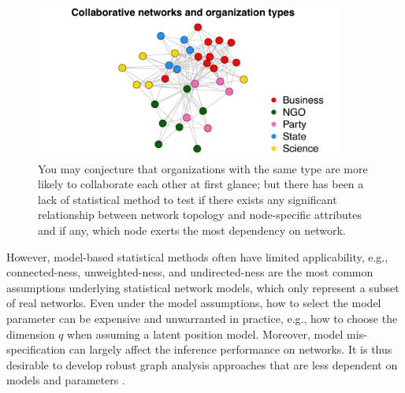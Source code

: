 \documentclass[11pt]{article}
\theoremstyle{definition}
\begin{document}
\begin{figure}[h]
	\centering
	\includegraphics[width=4in]{../Figure/introplot.pdf}	
	\caption{You may conjecture that organizations with the same type are more likely to collaborate each other at first glance; but there has been a lack of statistical method to test if there exists any significant relationship between network topology and node-specific attributes and if any, which node exerts the most dependency on network.}
	\label{fig:intro}
\end{figure}

However, model-based statistical methods often have limited applicability, e.g., connected-ness, unweighted-ness, and undirected-ness are the most common assumptions underlying statistical network models, which only represent a subset of real networks. Even under the model assumptions, how to select the model parameter can be expensive and unwarranted in practice, e.g., how to choose the dimension $q$ when assuming a latent position model. Moreover, model mis-specification can largely affect the inference performance on networks. It is thus desirable to develop robust graph analysis approaches that are less dependent on models and parameters \cite{ChenShenVogelsteinPriebe2016}.
\end{document}
